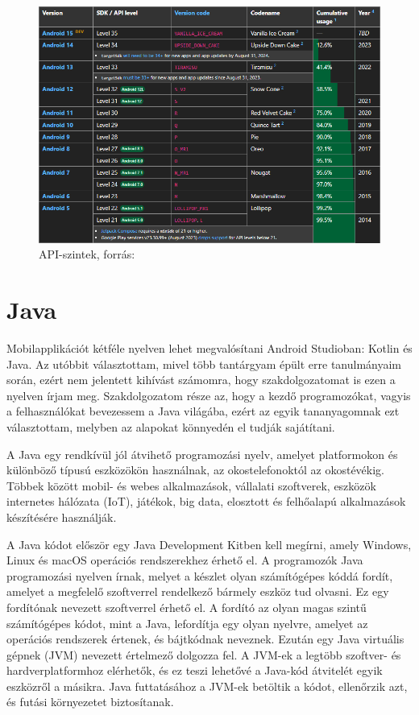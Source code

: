 \documentclass{thesis-ekf}
\begin{document}
	\begin{figure}[tbh]
		\centering
		\includegraphics[width=1.0\linewidth]{api_szintek}
		\caption{API-szintek, forrás: \cite{api}}
		\label{apiszintek}
	\end{figure}
	
	\section{Java}
	Mobilapplikációt kétféle nyelven lehet megvalósítani Android Studioban: Kotlin és Java. Az utóbbit választottam, mivel több tantárgyam épült erre tanulmányaim során, ezért nem jelentett kihívást számomra, hogy szakdolgozatomat is ezen a nyelven írjam meg. Szakdolgozatom része az, hogy a kezdő programozókat, vagyis a felhasználókat bevezessem a Java világába, ezért az egyik tananyagomnak ezt választottam, melyben az alapokat könnyedén el tudják sajátítani.
	
	A Java egy rendkívül jól átvihető programozási nyelv, amelyet platformokon és különböző típusú eszközökön használnak, az okostelefonoktól az okostévékig. Többek között mobil- és webes alkalmazások, vállalati szoftverek, eszközök internetes hálózata (IoT), játékok, big data, elosztott és felhőalapú alkalmazások készítésére használják.
	
	A Java kódot először egy Java Development Kitben kell megírni, amely Windows, Linux és macOS operációs rendszerekhez érhető el. A programozók Java programozási nyelven írnak, melyet a készlet olyan számítógépes kóddá fordít, amelyet a megfelelő szoftverrel rendelkező bármely eszköz tud olvasni. Ez egy fordítónak nevezett szoftverrel érhető el. A fordító az olyan magas szintű számítógépes kódot, mint a Java, lefordítja egy olyan nyelvre, amelyet az operációs rendszerek értenek, és bájtkódnak neveznek. Ezután egy Java virtuális gépnek (JVM) nevezett értelmező dolgozza fel. A JVM-ek a legtöbb szoftver- és hardverplatformhoz elérhetők, és ez teszi lehetővé a Java-kód átvitelét egyik eszközről a másikra. Java futtatásához a JVM-ek betöltik a kódot, ellenőrzik azt, és futási környezetet biztosítanak. \cite{java}
	
\end{document}
